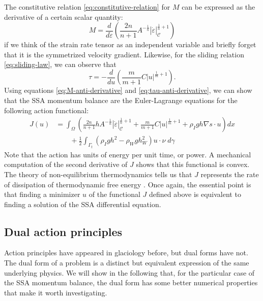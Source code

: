 \documentclass[twocolumn,letterpaper]{igs}
\begin{document}
The constitutive relation \eqref{eq:constitutive-relation} for $M$ can be expressed as the derivative of a certain scalar quantity:
\begin{equation}
    M = \frac{d}{d\dot\varepsilon}\left(\frac{2n}{n + 1}A^{-\frac{1}{n}}|\dot\varepsilon|_{\mathscr C}^{\frac{1}{n} + 1}\right)
    \label{eq:M-anti-derivative}
\end{equation}
if we think of the strain rate tensor as an independent variable and briefly forget that it is the symmetrized velocity gradient.
Likewise, for the sliding relation \eqref{eq:sliding-law}, we can observe that
\begin{equation}
    \tau = -\frac{d}{du}\left(\frac{m}{m + 1}C|u|^{\frac{1}{m} + 1}\right).
    \label{eq:tau-anti-derivative}
\end{equation}
Using equations \eqref{eq:M-anti-derivative} and \eqref{eq:tau-anti-derivative}, we can show that the SSA momentum balance are the Euler-Lagrange equations for the following action functional:
\begin{align}
    J(u) & = \int_\Omega\left(\frac{2n}{n + 1}hA^{-\frac{1}{n}}|\dot\varepsilon|_{\mathscr{C}}^{\frac{1}{n} + 1} + \frac{m}{m + 1}C|u|^{\frac{1}{m} + 1} + \rho_I gh\nabla s\cdot u\right)dx  \nonumber \\
    & \qquad + \frac{1}{2}\int_{\Gamma_t}\left(\rho_Igh^2 - \rho_Wgh_W^2\right)u\cdot\nu\; d\gamma
    \label{eq:ssa-primal-action}
\end{align}
Note that the action has units of energy per unit time, or power.
A mechanical computation of the second derivative of $J$ shows that this functional is convex.
The theory of non-equilibrium thermodynamics tells us that $J$ represents the rate of dissipation of thermodynamic free energy \citep{edelen1972nonlinear}.
Once again, the essential point is that finding a minimizer $u$ of the functional $J$ defined above is equivalent to finding a solution of the SSA differential equation.


\subsection{Dual action principles}
\label{subsec:dual-action-principles}

Action principles have appeared in glaciology before, but dual forms have not.
The dual form of a problem is a distinct but equivalent expression of the same underlying physics.
We will show in the following that, for the particular case of the SSA momentum balance, the dual form has some better numerical properties that make it worth investigating.
\end{document}

